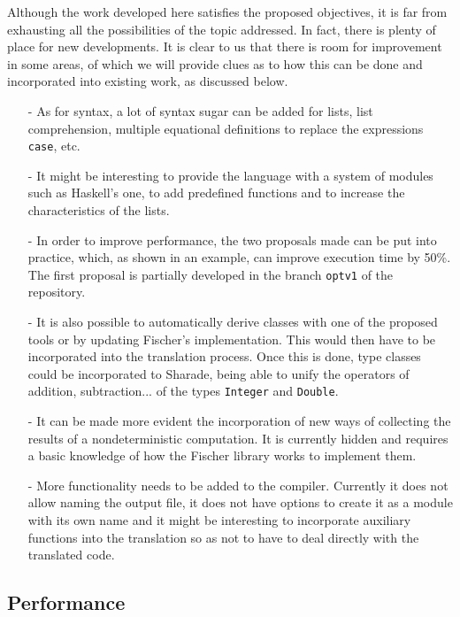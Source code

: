 \documentclass[class=article, crop=false]{standalone}
\begin{document}
Although the work developed here satisfies the proposed objectives, it is far from exhausting
all the possibilities of the topic addressed. In fact, there is plenty of place for new
developments. It is clear to us that there is room for improvement in some areas, of which we
will provide clues as to how this can be done and incorporated into existing work, as
discussed below.

\begin{itemize}
  \item[-] As for syntax, a lot of syntax sugar can be added for lists, list comprehension,
  multiple equational definitions to replace the expressions \verb`case`, etc.

  \item[-] It might be interesting to provide the language with a system of modules such as
  Haskell's one, to add predefined functions and to increase the characteristics of the
  lists.

  \item[-] In order to improve performance, the two proposals made can be put into practice,
  which, as shown in an example, can improve execution time by 50\%. The first proposal is
  partially developed in the branch \verb`optv1` of the repository.

  \item[-] It is also possible to automatically derive classes with one of the proposed tools
  or by updating Fischer's implementation. This would then have to be incorporated into the
  translation process. Once this is done, type classes could be incorporated to Sharade,
  being able to unify the operators of addition, subtraction... of the types \verb`Integer`
  and \verb`Double`.

  \item[-] It can be made more evident the incorporation of new ways of collecting the
  results of a nondeterministic computation. It is currently hidden and requires a basic
  knowledge of how the Fischer library works to implement them.

  \item[-] More functionality needs to be added to the compiler. Currently it does not allow
  naming the output file, it does not have options to create it as a module with its own name
  and it might be interesting to incorporate auxiliary functions into the translation so as
  not to have to deal directly with the translated code.
\end{itemize}

\subsection{Performance}
\end{document}
